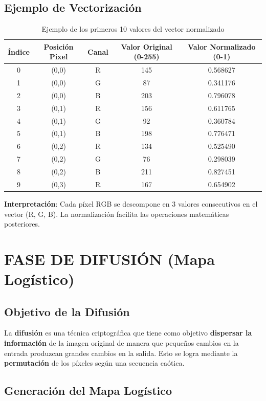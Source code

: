 \documentclass[12pt,a4paper]{article}
\begin{document}
\subsection{Ejemplo de Vectorización}

\begin{table}[H]
\centering
\caption{Ejemplo de los primeros 10 valores del vector normalizado}
\label{tab:vectorizacion}
\begin{tabular}{@{}ccccc@{}}
\toprule
\textbf{Índice} & \textbf{Posición Pixel} & \textbf{Canal} & \textbf{Valor Original (0-255)} & \textbf{Valor Normalizado (0-1)} \\ \midrule
0 & (0,0) & R & 145 & 0.568627 \\
1 & (0,0) & G & 87 & 0.341176 \\
2 & (0,0) & B & 203 & 0.796078 \\
3 & (0,1) & R & 156 & 0.611765 \\
4 & (0,1) & G & 92 & 0.360784 \\
5 & (0,1) & B & 198 & 0.776471 \\
6 & (0,2) & R & 134 & 0.525490 \\
7 & (0,2) & G & 76 & 0.298039 \\
8 & (0,2) & B & 211 & 0.827451 \\
9 & (0,3) & R & 167 & 0.654902 \\ \bottomrule
\end{tabular}
\end{table}

\textbf{Interpretación}: Cada píxel RGB se descompone en 3 valores consecutivos en el vector (R, G, B). La normalización facilita las operaciones matemáticas posteriores.

\section{FASE DE DIFUSIÓN (Mapa Logístico)}

\subsection{Objetivo de la Difusión}

La \textbf{difusión} es una técnica criptográfica que tiene como objetivo \textbf{dispersar la información} de la imagen original de manera que pequeños cambios en la entrada produzcan grandes cambios en la salida. Esto se logra mediante la \textbf{permutación} de los píxeles según una secuencia caótica.

\subsection{Generación del Mapa Logístico}
\end{document}
